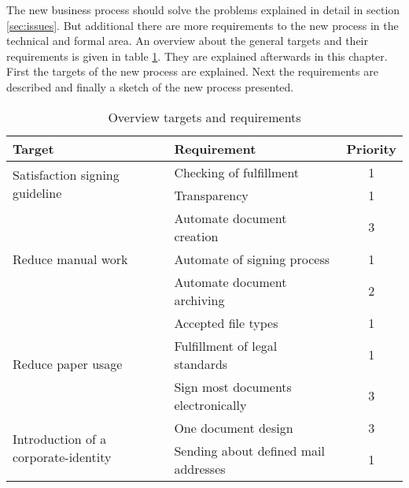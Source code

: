 The new business process should solve the problems explained in detail in section \ref{sec:issues}. But additional there are more requirements to the new process in the technical and formal area. An overview about the general targets and their requirements is given in table \ref{tab:overviewTargets}. They are explained afterwards in this chapter. First the targets of the new process are explained. Next the requirements are described and finally a sketch of the new process presented. 

\begin{table}[h!]
	\begin{tabular}{|l|l|c|} \hline
		Target & Requirement & Priority \\ \hline
		\multirow{2}{*}{Satisfaction signing guideline} & Checking of fulfillment & 1 \\ \cline{2-3}
														& Transparency & 1 \\ \hline
		\multirow{3}{*}{Reduce manual work} & Automate document creation & 3 \\ \cline{2-3}
											& Automate of signing process & 1 \\ \cline{2-3}
											& Automate document archiving & 2 \\ \hline
		\multirow{3}{*}{Reduce paper usage} & Accepted file types & 1 \\ \cline{2-3}
											& Fulfillment of legal standards & 1 \\ \cline{2-3}
											& Sign most documents electronically & 3 \\ \hline
		\multirow{2}{*}{Introduction of a corporate-identity} & One document design & 3 \\ \cline{2-3}
											& Sending about defined mail addresses & 1 \\ \hline
	\end{tabular}
	\centering
	\caption{Overview targets and requirements}
	\label{tab:overviewTargets}
\end{table}


